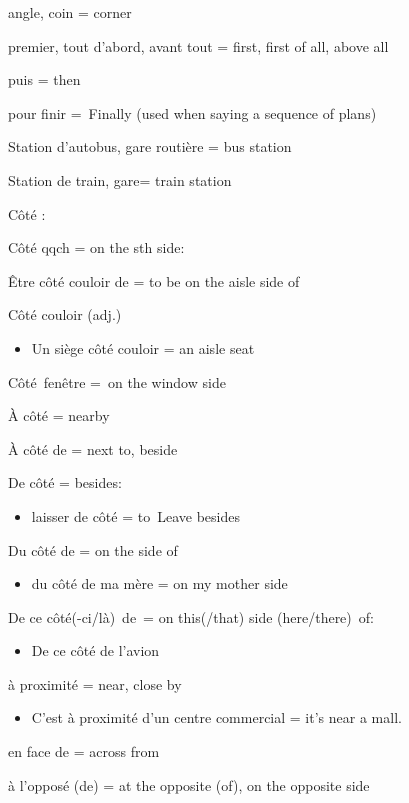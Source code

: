 angle, coin = corner

premier, tout d'abord, avant tout = first, first of all, above all

puis = then

pour finir =~Finally (used when saying a sequence of plans)

Station d'autobus, gare routière = bus station

Station de train, gare= train station

Côté :

Côté qqch = on the sth side:

Être côté couloir de = to be on the aisle side of

Côté couloir (adj.)

\begin{itemize}
\item
  Un siège côté couloir = an aisle seat~
\end{itemize}

Côté~fenêtre =~on the window side

À côté = nearby

À côté de = next to, beside

De côté = besides:

\begin{itemize}
\item
  laisser de côté = to~Leave besides
\end{itemize}

Du côté de = on the side of

\begin{itemize}
\item
  du côté de ma mère = on my mother side
\end{itemize}

De ce côté(-ci/là)~de~= on this(/that) side (here/there)~of:~

\begin{itemize}
\item
  De ce côté de l'avion~
\end{itemize}

à proximité = near, close by

\begin{itemize}
\item
  C'est {à proximité d}'un centre commercial = it's {near} a mall.
\end{itemize}

en face de = across from

à l'opposé (de) = at the opposite (of), on the opposite side

